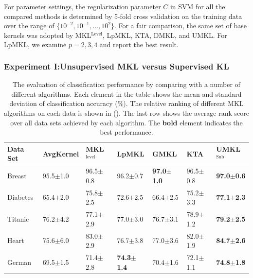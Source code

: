 For parameter settings, the regularization parameter $C$ in SVM for all the compared methods is determined by 5-fold cross validation on the training data over the range of $\{10^{-2}, 10^{-1}, \ldots, 10^2\}$. For a fair comparison, the same set of base
kernels was adopted by MKL$^{\mathrm{Level}}$, LpMKL, KTA, DMKL, and UMKL.  For LpMKL, we examine
$p=2,3,4$ and report the best result.

\subsubsection{Experiment I:Unsupervised MKL versus Supervised KL}

\begin{table}[!thbp] \label{table:exp1-result}
\vspace{-0.1in} \centering \caption{The evaluation of classification performance by comparing with a number of different algorithms. Each element in the table shows the mean and standard deviation of classification accuracy (\%). The relative ranking of different MKL algorithms on each data is shown in (). The last row shows the average rank score over all data sets achieved by each algorithm. The {\bf bold} element indicates the best performance.}
\begin{center}
{\small
\begin{tabular}{l|l|lllll}
\hline
Data Set  &AvgKernel & MKL$^{\mathrm{level}}$
    &LpMKL  &GMKL  &KTA &UMKL$^{\mathrm{Sub}}$\\
\hline
\hline              %
Breast          &95.5$\pm$1.0      &96.5$\pm$0.8 &96.2$\pm$0.7  &{\bf 97.0$\pm$1.0}  &96.5$\pm$0.8 &{\bf 97.0$\pm$0.6}\\
Diabetes       &65.4$\pm$2.0  &75.8$\pm$2.5  &72.6$\pm$2.5 &66.4$\pm$2.5   &75.2$\pm$3.3 &{\bf 77.1$\pm$2.3}\\
Titanic         &76.2$\pm$4.2     &77.1$\pm$2.9    &77.0$\pm$3.0 &76.7$\pm$3.1       &78.9$\pm$1.2 &{\bf79.2$\pm$2.5}\\
Heart          &75.6$\pm$6.0    &83.0$\pm$2.9   &76.7$\pm$3.8 &77.0$\pm$3.6    &82.0$\pm$1.9 &{\bf 84.7$\pm$2.6}\\
German          &69.5$\pm$1.5   &71.4$\pm$2.8   &{\bf74.3$\pm$1.4} &70.4$\pm$1.6   &72.1$\pm$1.1 &{\bf74.8$\pm$1.8}\\

\end{tabular}}
\end{center}
\end{table}
